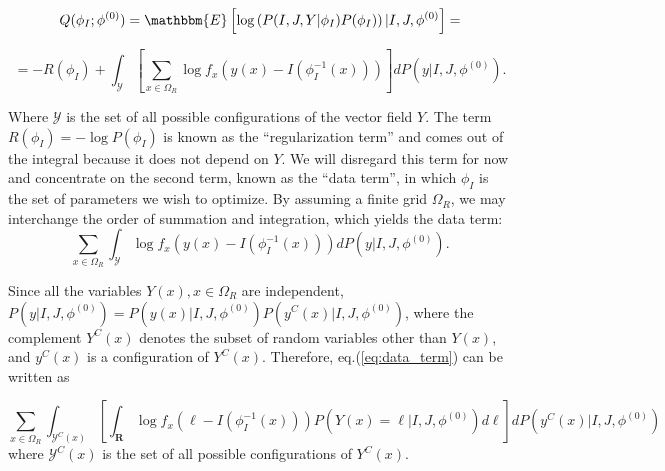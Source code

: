 \begin{equation}
    Q(\phi_{I}; \phi^{(0)}) = \mathbbm{E}\left[ \log \left(P(I, J, Y|\phi_{I})P(\phi_{I})\right) | I, J, \phi^{(0)}\right] =
\end{equation}

\begin{equation}
    =-R(\phi_{I}) + \int_{\mathcal{Y}}\left[\sum_{x\in\Omega_{R}} \log f_{x}\left(y(x) - I(\phi^{-1}_{I}(x))\right) \right] dP(y | I, J, \phi^{(0)}).
\end{equation}

Where $\mathcal{Y}$ is the set of all possible configurations of the vector field $Y$. The term $R(\phi_{I}) = -\log P(\phi_{I})$ is known as the ``regularization term'' and comes out of the
integral because it does not depend on $Y$. We will disregard this term for now and concentrate on the second term, known as the ``data term'', in which $\phi_{I}$ is the
set of parameters we wish to optimize. By assuming a finite grid $\Omega_{R}$, we may interchange the order of summation and integration, which yields the data term:
\begin{equation}\label{eq:data_term}
    \sum_{x\in\Omega_{R}} \int_{\mathcal{Y}} \log f_{x}\left(y(x) - I(\phi^{-1}_{I}(x))\right)  dP(y | I, J, \phi^{(0)}).
\end{equation}

Since all the variables $Y(x), x\in\Omega_{R}$ are independent, $P(y | I, J, \phi^{(0)}) = P(y(x)| I, J, \phi^{(0)})P(y^{C}(x) | I, J, \phi^{(0)})$, where the complement $Y^{C}(x)$
denotes the subset of random variables other than $Y(x)$, and $y^{C}(x)$ is a configuration of $Y^{C}(x)$. Therefore, eq.(\eqref{eq:data_term}) can be written as

\begin{equation}
    \sum_{x\in\Omega_{R}} \int_{\mathcal{Y}^{C}(x)} \left[\int_{\mathbf{R}} \log f_{x}\left(\ell - I(\phi^{-1}_{I}(x))\right) P(Y(x) = \ell | I, J, \phi^{(0)})d\ell\right]  dP(y^{C}(x) | I, J, \phi^{(0)})
\end{equation}
where $\mathcal{Y}^{C}(x)$ is the set of all possible configurations of $Y^{C}(x)$.\\

